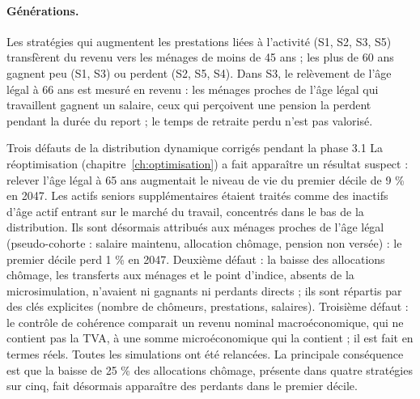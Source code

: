 \begin{table}[htbp]\centering\scriptsize
\caption{Revenu réel après propagation par statut de la personne de référence, 2035 (€ par UC et \%).}
\end{table}

\begin{table}[htbp]\centering\scriptsize
\caption{Par statut d'occupation du logement, 2035.}
\end{table}

\begin{table}[htbp]\centering\scriptsize
\caption{Par configuration familiale, 2035.}
\end{table}

\begin{table}[htbp]\centering\scriptsize
\caption{Par âge de la personne de référence (transferts entre générations), 2035.}
\end{table}

\paragraph{Générations.} Les stratégies qui augmentent les prestations liées à l'activité (S1, S2, S3, S5) transfèrent
du revenu vers les ménages de moins de 45 ans ; les plus de 60 ans gagnent peu (S1, S3) ou perdent (S2, S5, S4). Dans
S3, le relèvement de l'âge légal à 66 ans est mesuré en revenu : les ménages proches de l'âge légal qui travaillent
gagnent un salaire, ceux qui perçoivent une pension la perdent pendant la durée du report ; le temps de retraite perdu
n'est pas valorisé.

\begin{encadre}{Trois défauts de la distribution dynamique corrigés pendant la phase 3.1}
La réoptimisation (chapitre~\ref{ch:optimisation}) a fait apparaître un résultat suspect : relever l'âge légal à 65 ans
augmentait le niveau de vie du premier décile de 9 \% en 2047. Les actifs seniors supplémentaires étaient traités comme
des inactifs d'âge actif entrant sur le marché du travail, concentrés dans le bas de la distribution. Ils sont désormais
attribués aux ménages proches de l'âge légal (pseudo-cohorte : salaire maintenu, allocation chômage, pension non
versée) : le premier décile perd 1 \% en 2047. Deuxième défaut : la baisse des allocations chômage, les transferts aux
ménages et le point d'indice, absents de la microsimulation, n'avaient ni gagnants ni perdants directs ; ils sont
répartis par des clés explicites (nombre de chômeurs, prestations, salaires). Troisième défaut : le contrôle de
cohérence comparait un revenu nominal macroéconomique, qui ne contient pas la TVA, à une somme microéconomique qui la
contient ; il est fait en termes réels. Toutes les simulations ont été relancées. La principale conséquence est que la
baisse de 25 \% des allocations chômage, présente dans quatre stratégies sur cinq, fait désormais apparaître des
perdants dans le premier décile.
\end{encadre}
